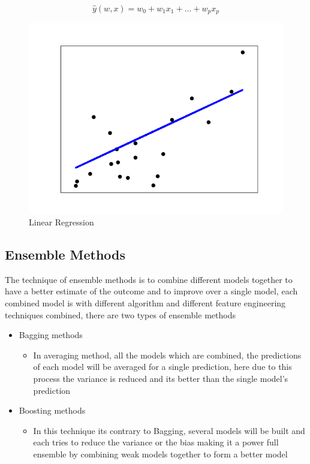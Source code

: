 \begin{itemize}
\begin{itemize}
    \begin{equation}
        \hat{y}(w, x) = w_0 + w_1 x_1 + ... + w_p x_p
        \label{eqn:linreg}
    \end{equation}
    
    \begin{figure}[!h]
        	\centering
        	\includegraphics[width=0.6\linewidth]{thesis_template/images/linreg.png}
        	\caption{Linear Regression}
        	\label{fig:linreg}
            \end{figure}
            
\end{itemize}
\end{itemize}


\subsection{Ensemble Methods}
The technique of ensemble methods is to combine different models together to have a better estimate of the outcome and to improve over a single model, each combined model is with different algorithm and different feature engineering techniques combined, there are two types of ensemble methods
\begin{itemize}
    \item Bagging methods 
    \begin{itemize}
        \item In averaging method, all the models which are combined, the predictions of each model will be averaged for a single prediction, here due to this process the variance is reduced and its better than the single model's prediction
    \end{itemize}
    
    \item Boosting methods
    \begin{itemize}
        \item In this technique its contrary to Bagging, several models will be built and each  tries to reduce the variance or the bias making it a power full ensemble by combining weak models together to form a better model
    \end{itemize}
\end{itemize}

